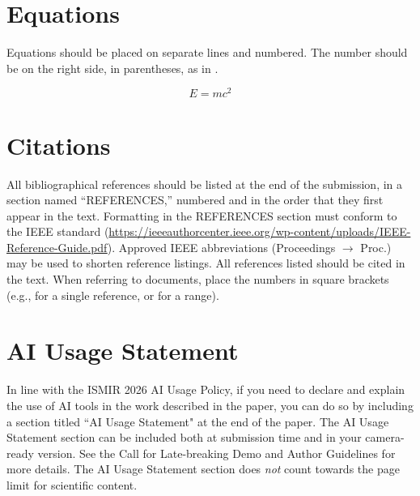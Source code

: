 \documentclass{article}
\begin{document}
\section{Equations}

Equations should be placed on separate lines and numbered.
The number should be on the right side, in parentheses, as in .

\begin{equation}\label{relativity}
E=mc^{2}
\end{equation}

\section{Citations}

All bibliographical references should be listed at the end of the submission, in a section named ``REFERENCES,'' numbered and in the order that they first appear in the text. Formatting in the REFERENCES section must conform to the IEEE standard (\url{https://ieeeauthorcenter.ieee.org/wp-content/uploads/IEEE-Reference-Guide.pdf}). Approved IEEE abbreviations (Proceedings $\rightarrow$ Proc.) may be used to shorten reference listings. All references listed should be cited in the text. When referring to documents, place the numbers in square brackets (e.g., \cite{Mueller21_FMP_SPRINGER} for a single reference, or \cite{KneesS16_MusicSimilarityRetrieval_SPRINGER,WeihsJVR16_MusicDataAnalysis_CRC,Lerch23_AudioContentAnalysis_WILEY,SerraEtAl13_RoadmapMIR_CreativeCommon} for a range).


\section{AI Usage Statement}

In line with the ISMIR 2026 AI Usage Policy, if you need to declare and explain the use of AI tools in the work described in the paper, you can do so by including a section titled ``AI Usage Statement" at the end of the paper. The AI Usage Statement section can be included both at submission time and in your camera-ready version. See the Call for Late-breaking Demo and Author Guidelines for more details. The AI Usage Statement section does \textit{not} count towards the page limit for scientific content. 




%
%
%
%
%
\end{document}
